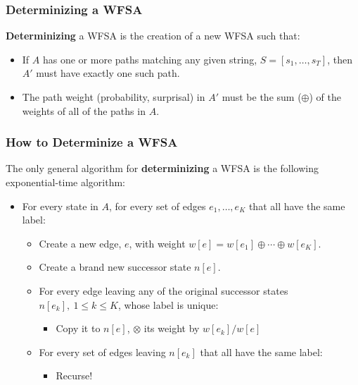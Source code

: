 \documentclass{beamer}
\begin{document}
\begin{frame}
  \frametitle{Determinizing a WFSA}

  {\bf Determinizing} a WFSA is the creation of a new WFSA such that:
  \begin{itemize}
  \item If $A$ has one or more paths matching any given string,
    $S=[s_1,\ldots,s_T]$, then $A'$ must have exactly one such path.
  \item The path weight (probability, surprisal) in $A'$ must be the
    sum ($\oplus$) of the weights of all of the paths in $A$.
  \end{itemize}

\end{frame}

\begin{frame}
  \frametitle{How to Determinize a WFSA}

  The only general algorithm for {\bf determinizing} a WFSA is the
  following exponential-time algorithm:
  \begin{itemize}
  \item For every state in $A$, for every set of edges
    $e_1,\ldots,e_K$ that all have the same label:
    \begin{itemize}
    \item Create a new edge, $e$, with weight $w[e]=w[e_1]\oplus\cdots\oplus w[e_K]$.
    \item Create a brand new successor state $n[e]$.
    \item For every edge leaving any of the original successor states
      $n[e_k],~1\le k\le K$, whose label is unique:
      \begin{itemize}
      \item Copy  it to $n[e]$, $\otimes$ its weight by $w[e_k]/w[e]$
      \end{itemize}
    \item For every set of edges leaving $n[e_k]$ that all have the
      same label:
      \begin{itemize}
      \item Recurse!
      \end{itemize}
    \end{itemize}
  \end{itemize}
\end{frame}
\end{document}
